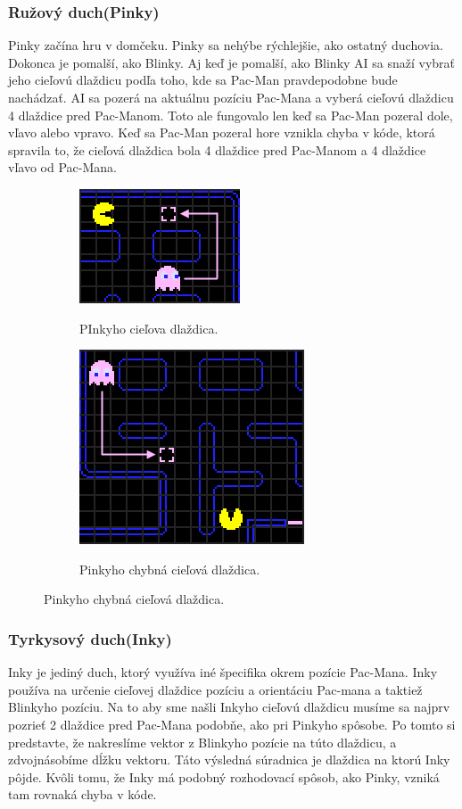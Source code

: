 \documentclass[10pt,oneside,slovak,a4paper]{article}
\begin{document}
\subsubsection{Ružový duch(Pinky)}\label{pink}
Pinky začína hru v domčeku. Pinky sa nehýbe rýchlejšie, ako ostatný duchovia. Dokonca je pomalší, ako Blinky. Aj keď je pomalší, ako Blinky AI sa snaží vybrať jeho cieľovú dlaždicu podľa toho, kde sa Pac-Man pravdepodobne bude nachádzať. AI sa pozerá na aktuálnu pozíciu Pac-Mana a vyberá cieľovú dlaždicu 4 dlaždice pred Pac-Manom. Toto ale fungovalo len keď sa Pac-Man pozeral dole, vľavo alebo vpravo. Keď sa Pac-Man pozeral hore vznikla chyba v kóde, ktorá spravila to, že cieľová dlaždica bola 4 dlaždice pred Pac-Manom a 4 dlaždice vľavo od Pac-Mana.\cite{4.zdroj}
\begin{figure}[h!]
  \centering
  \begin{subfigure}[b]{0.4\linewidth}
    \includegraphics[scale=0.75]{pinky-targeting.png}
    \caption{PInkyho cieľova dlaždica.}
\cite{2.zdroj}
  \end{subfigure}
  \begin{subfigure}[b]{0.5\linewidth}
    \includegraphics[scale=0.5]{pinky-targeting2.png}
    \caption{Pinkyho chybná cieľová dlaždica.}
\cite{2.zdroj}
  \end{subfigure}
\end{figure}

\subsubsection{Tyrkysový duch(Inky)}\label{Inky}
Inky je jediný duch, ktorý využíva iné špecifika okrem pozície Pac-Mana. Inky používa na určenie cieľovej dlaždice pozíciu a orientáciu Pac-mana a taktiež Blinkyho pozíciu. Na to aby sme našli Inkyho cieľovú dlaždicu musíme sa najprv pozrieť 2 dlaždice pred Pac-Mana podobňe, ako pri Pinkyho spôsobe. Po tomto si predstavte, že nakreslíme vektor z Blinkyho pozície na túto dlaždicu, a zdvojnásobíme dĺžku vektoru. Táto výsledná súradnica je dlaždica na ktorú Inky pôjde. Kvôli tomu, že Inky má podobný rozhodovací spôsob, ako Pinky, vzniká tam rovnaká chyba v kóde.\cite{2.zdroj}
\end{document}
